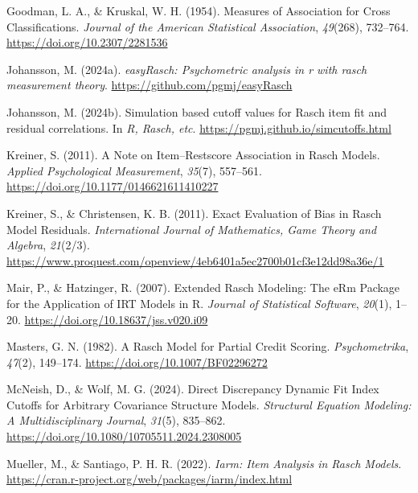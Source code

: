 \documentclass[
  letterpaper,
  DIV=11,
  numbers=noendperiod]{scrartcl}
\newlength{\cslhangindent}
\newenvironment{CSLReferences}[2] %
 {\begin{list}{}{%
  \setlength{\itemindent}{0pt}
  \setlength{\leftmargin}{0pt}
  \setlength{\parsep}{0pt}
  \ifodd #1
   \setlength{\leftmargin}{\cslhangindent}
   \setlength{\itemindent}{-1\cslhangindent}
  \fi
  \setlength{\itemsep}{#2\baselineskip}}}
 {\end{list}}
\begin{document}
\begin{CSLReferences}{1}{0}
Goodman, L. A., \& Kruskal, W. H. (1954). Measures of {Association} for
{Cross} {Classifications}. \emph{Journal of the American Statistical
Association}, \emph{49}(268), 732--764.
\url{https://doi.org/10.2307/2281536}

Johansson, M. (2024a). \emph{easyRasch: Psychometric analysis in r with
rasch measurement theory}. \url{https://github.com/pgmj/easyRasch}

Johansson, M. (2024b). Simulation based cutoff values for {Rasch} item
fit and residual correlations. In \emph{R, Rasch, etc}.
\url{https://pgmj.github.io/simcutoffs.html}

Kreiner, S. (2011). A {Note} on {Item}--{Restscore} {Association} in
{Rasch} {Models}. \emph{Applied Psychological Measurement},
\emph{35}(7), 557--561. \url{https://doi.org/10.1177/0146621611410227}

Kreiner, S., \& Christensen, K. B. (2011). Exact {Evaluation} of {Bias}
in {Rasch} {Model} {Residuals}. \emph{International Journal of
Mathematics, Game Theory and Algebra}, \emph{21}(2/3).
\url{https://www.proquest.com/openview/4eb6401a5ec2700b01cf3e12dd98a36e/1}

Mair, P., \& Hatzinger, R. (2007). Extended {Rasch} {Modeling}: {The}
{eRm} {Package} for the {Application} of {IRT} {Models} in {R}.
\emph{Journal of Statistical Software}, \emph{20}(1), 1--20.
\url{https://doi.org/10.18637/jss.v020.i09}

Masters, G. N. (1982). A {Rasch} {Model} for {Partial} {Credit}
{Scoring}. \emph{Psychometrika}, \emph{47}(2), 149--174.
\url{https://doi.org/10.1007/BF02296272}

McNeish, D., \& Wolf, M. G. (2024). Direct {Discrepancy} {Dynamic} {Fit}
{Index} {Cutoffs} for {Arbitrary} {Covariance} {Structure} {Models}.
\emph{Structural Equation Modeling: A Multidisciplinary Journal},
\emph{31}(5), 835--862.
\url{https://doi.org/10.1080/10705511.2024.2308005}

Mueller, M., \& Santiago, P. H. R. (2022). \emph{Iarm: {Item} {Analysis}
in {Rasch} {Models}}.
\url{https://cran.r-project.org/web/packages/iarm/index.html}


\end{CSLReferences}
\end{document}
